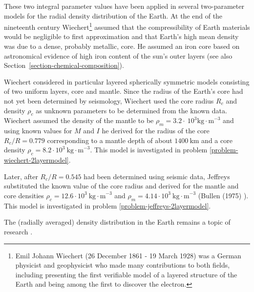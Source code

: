 These two integral parameter values have been applied in several 
two-parameter models for the radial density distribution of the Earth.
At the end of the nineteenth century Wiechert\footnote{Emil Johann 
Wiechert (26 December 1861 - 19 March 1928) was a German physicist 
and geophysicist who made many contributions to both fields, 
including presenting the first verifiable model of a layered structure of the 
Earth and being among the first to discover the electron.} assumed that the 
compressibility of Earth materials would be negligible to first
approximation and that Earth's high mean density was due to a dense,
probably metallic, core.
He assumed an iron core based on astronomical evidence of high iron
content of the sun's outer layers 
(see also Section~\ref{section-chemical-composition}).

Wiechert considered in particular layered spherically symmetric 
models consisting of two uniform layers, core and mantle.
Since the radius of the Earth's core had not yet been determined by
seismology, Wiechert used the core radius $R_c$ and density 
$\rho_c$ as unknown parameters to be determined from the
known data.
Wiechert assumed the density of the mantle to be 
$\rho_m=3.2 \cdot~10^3 \mathrm{kg\cdot m}^{-3}$ and using known values for $M$ and $I$
he derived for the radius of the core
$R_c/R = 0.779$ corresponding to a mantle depth of about
$1400~\mathrm{km}$ and a core density 
$\rho_c=8.2\cdot 10^3~\mathrm{kg\cdot m}^{-3}$.
This model is investigated in problem 
\ref{problem-wiechert-2layermodel}.

Later, after $R_c/R = 0.545$ had been determined using
seismic data, Jeffreys substituted the known value of the
core radius and derived for the mantle and core densities
$\rho_c=12.6\cdot 10^3~ \mathrm{kg\cdot m}^{-3}$ and 
$\rho_m=4.14\cdot 10^3~ \mathrm{kg\cdot m}^{-3}$ (Bullen (1975) \cite{bull75}).
This model is investigated in problem 
\ref{problem-jeffreys-2layermodel}.

The (radially averaged) density distribution in the Earth remains a topic of research
\cite{kenn98}.
